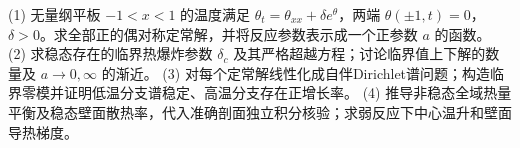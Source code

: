 (1) 无量纲平板 \(-1<x<1\) 的温度满足 \(\theta_t=\theta_{xx}+\delta e^\theta\)，两端 \(\theta(\pm1,t)=0\)，\(\delta>0\)。求全部正的偶对称定常解，并将反应参数表示成一个正参数 \(a\) 的函数。
(2) 求稳态存在的临界热爆炸参数 \(\delta_c\) 及其严格超越方程；讨论临界值上下解的数量及 \(a\to0,\infty\) 的渐近。
(3) 对每个定常解线性化成自伴Dirichlet谱问题；构造临界零模并证明低温分支谱稳定、高温分支存在正增长率。
(4) 推导非稳态全域热量平衡及稳态壁面散热率，代入准确剖面独立积分核验；求弱反应下中心温升和壁面导热梯度。
